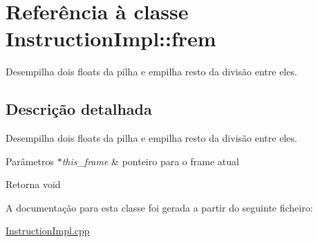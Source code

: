 \hypertarget{class_instruction_impl_1_1frem}{}\section{Referência à classe Instruction\+Impl\+:\+:frem}
\label{class_instruction_impl_1_1frem}


Desempilha dois floats da pilha e empilha resto da divisão entre eles.  




\subsection{Descrição detalhada}
Desempilha dois floats da pilha e empilha resto da divisão entre eles. 


\begin{DoxyParams}{Parâmetros}
{\em $\ast$this\+\_\+frame} & ponteiro para o frame atual \\
\hline
\end{DoxyParams}
\begin{DoxyReturn}{Retorna}
void 
\end{DoxyReturn}


A documentação para esta classe foi gerada a partir do seguinte ficheiro\+:\begin{DoxyCompactItemize}
\item 
\hyperlink{_instruction_impl_8cpp}{Instruction\+Impl.\+cpp}\end{DoxyCompactItemize}
